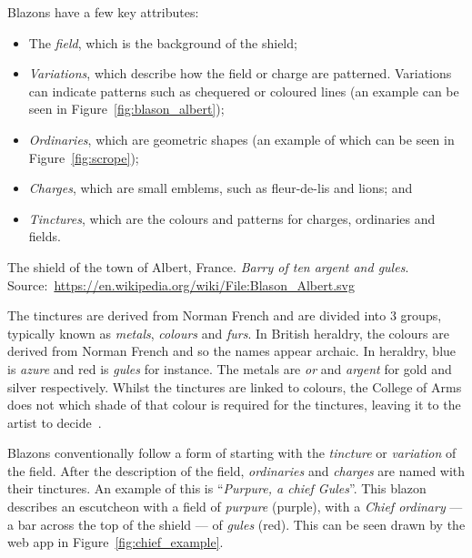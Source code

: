 \documentclass[nobib, a4paper, twoside, justified]{tufte-book}
\begin{document}
Blazons have a few key attributes:
\begin{itemize}
  \item The \textit{field}, which is the background of the shield;
  \item \textit{Variations}, which describe how the field or charge are patterned. Variations can
    indicate patterns such as chequered or coloured lines (an example can be seen in
    Figure~\ref{fig:blason_albert});
  \item \textit{Ordinaries}, which are geometric shapes (an example of which can be seen in
    Figure~\ref{fig:scrope});
  \item \textit{Charges}, which are small emblems, such as fleur-de-lis and lions; and
  \item \textit{Tinctures}, which are the colours and patterns for charges, ordinaries and fields.
\end{itemize}

\begin{marginfigure}
  \centering
  \def\svgwidth{0.8\linewidth}
  
  \caption{The shield of the town of Albert, France. \textit{Barry of ten argent and
  gules}. Source:~\url{https://en.wikipedia.org/wiki/File:Blason_Albert.svg}}\label{fig:blason_albert}
\end{marginfigure}

The tinctures are derived from Norman French and are divided into 3 groups, typically known as
\textit{metals}, \textit{colours} and \textit{furs}. In British heraldry, the colours are derived
from Norman French and so the names appear archaic. In heraldry, blue is \textit{azure} and red is
\textit{gules} for instance. The metals are \textit{or} and \textit{argent} for gold and silver
respectively. Whilst the tinctures are linked to colours, the College of Arms does not which shade
of that colour is required for the tinctures, leaving it to the artist to
decide~\autocite{college_of_arms_faq}.

Blazons conventionally follow a form of starting with the \textit{tincture} or \textit{variation}
of the field. After the description of the field, \textit{ordinaries} and \textit{charges} are
named with their tinctures. An example of this is ``\textit{Purpure, a chief Gules}''. This blazon
describes an escutcheon with a field of \textit{purpure} (purple), with a \textit{Chief ordinary}
--- a bar across the top of the shield --- of \textit{gules} (red). This can be seen drawn by the
web app in Figure~\ref{fig:chief_example}.
\end{document}
